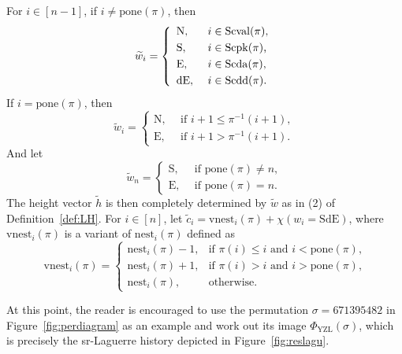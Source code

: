 \documentclass[12pt]{amsart}
\numberwithin{equation}{section}
\theoremstyle{plain}
\theoremstyle{definition}
\def\YZL{\mathrm{YZL}}
\def\N{\mathrm{N}}
\def\S{\mathrm{S}}
\def\E{\mathrm{E}}
\def\dE{\mathrm{dE}}
\def\SdE{\mathrm{SdE}}
\def\Scpk{\mathrm{Scpk}}
\def\Scval{\mathrm{Scval}}
\def\Scda{\mathrm{Scda}}
\def\Scdd{\mathrm{Scdd}}
\def\pone{\mathrm{pone}}
\def\vnest{\mathrm{vnest}}
\def\nest{\mathrm{nest}}
\begin{document}
For $i \in [n-1]$, if $i \neq \pone(\pi)$, then
\begin{equation*}
\widetilde{w}_i= \left\{
  \begin{array}{ll}
\N, & \mbox{ $ i \in \Scval(\pi)$,}\\[3pt]
\S, & \mbox{  $ i \in \Scpk(\pi)$,} \\[3pt]
\E, & \mbox{  $ i \in \Scda(\pi)$,}\\[3pt]
\dE, & \mbox{  $ i \in \Scdd(\pi)$.}
 \end{array} \right.
\end{equation*}
 If $i=\pone(\pi)$, then
 \[\widetilde{w}_i=\begin{cases}
    \N, & ~~\text{if $i+1 \leq \pi^{-1}(i+1),$} \\[3pt]
	\E, & ~~\text{if $i+1 > \pi^{-1}(i+1).$}
	\end{cases}
\]
And let
\[\widetilde{w}_n=\begin{cases}
    \S, & ~~\text{if $\pone(\pi) \neq n,$} \\[3pt]
	\E, & ~~\text{if $\pone(\pi) = n.$}
	\end{cases}
\]
The height vector $\widetilde{h}$ is then completely determined by $\widetilde{w}$ as in (2) of Definition~\ref{def:LH}. For $i \in [n]$, let $\widetilde{c}_i=\vnest_i(\pi)+\chi(w_i=\SdE)$, where $\vnest_i(\pi)$ is a variant of $\nest_i(\pi)$ defined as
\begin{equation}\label{def:vnest}
\vnest_i(\pi)=\begin{cases}
	\nest_i(\pi)-1, & \text{if $\pi(i) \leq i$ and $i < \pone(\pi)$,} \\[3pt]
	\nest_i(\pi)+1, & \text{if $\pi(i) > i$ and $i > \pone(\pi)$,} \\[3pt]
	\nest_i(\pi), & \text{otherwise}.
	\end{cases}
\end{equation}

At this point, the reader is encouraged to use the permutation $\sigma=671395482$ in Figure~\ref{fig:perdiagram} as an example and work out its image $\Phi_{\YZL}(\sigma)$, which is precisely the sr-Laguerre history depicted in Figure~\ref{fig:reslagu}.
\end{document}
